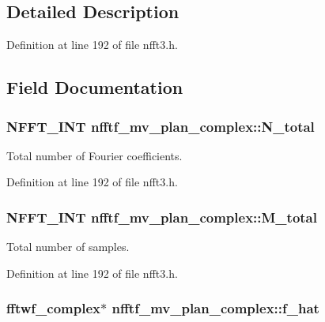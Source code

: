 \subsection{Detailed Description}


Definition at line 192 of file nfft3.\-h.



\subsection{Field Documentation}
\hypertarget{structnfftf__mv__plan__complex_aef57ee79b358ffeac59de31b788a687f}{
\subsubsection[{N\-\_\-total}]{\setlength{\rightskip}{0pt plus 5cm}N\-F\-F\-T\-\_\-\-I\-N\-T nfftf\-\_\-mv\-\_\-plan\-\_\-complex\-::\-N\-\_\-total}}\label{structnfftf__mv__plan__complex_aef57ee79b358ffeac59de31b788a687f}


Total number of Fourier coefficients. 



Definition at line 192 of file nfft3.\-h.

\hypertarget{structnfftf__mv__plan__complex_a01242722facc53c79fba9c947741e01e}{
\subsubsection[{M\-\_\-total}]{\setlength{\rightskip}{0pt plus 5cm}N\-F\-F\-T\-\_\-\-I\-N\-T nfftf\-\_\-mv\-\_\-plan\-\_\-complex\-::\-M\-\_\-total}}\label{structnfftf__mv__plan__complex_a01242722facc53c79fba9c947741e01e}


Total number of samples. 



Definition at line 192 of file nfft3.\-h.

\hypertarget{structnfftf__mv__plan__complex_ad55a895ef394e9b74db36d028656b382}{
\subsubsection[{f\-\_\-hat}]{\setlength{\rightskip}{0pt plus 5cm}fftwf\-\_\-complex$\ast$ nfftf\-\_\-mv\-\_\-plan\-\_\-complex\-::f\-\_\-hat}}\label{structnfftf__mv__plan__complex_ad55a895ef394e9b74db36d028656b382}


